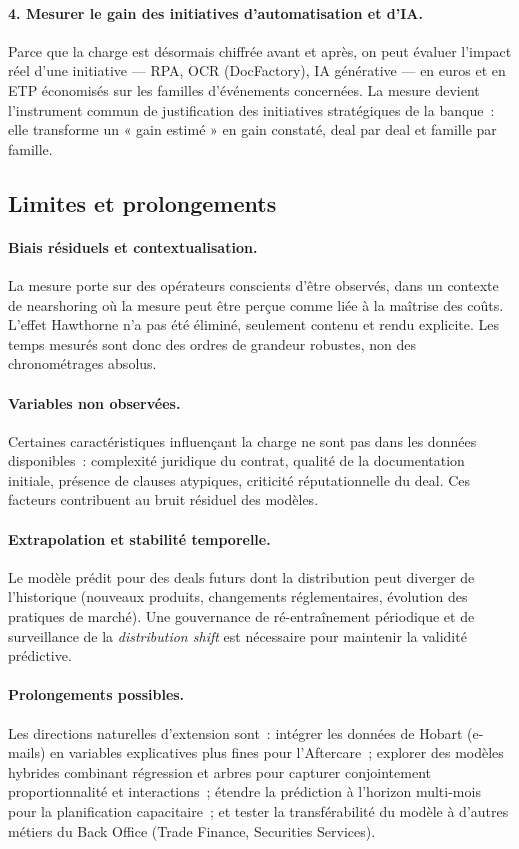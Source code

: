 \paragraph{4. Mesurer le gain des initiatives d'automatisation et d'IA.} 
Parce que la charge est désormais chiffrée avant et après, on peut évaluer l'impact réel d'une
initiative --- RPA, OCR (DocFactory), IA générative --- en euros et en ETP économisés
sur les familles d'événements concernées. La mesure devient l'instrument commun de
justification des initiatives stratégiques de la banque~: elle transforme un « gain
estimé » en gain constaté, deal par deal et famille par famille.


\subsection{Limites et prolongements}
\label{sec:limites}

\paragraph{Biais résiduels et contextualisation.}
La mesure porte sur des opérateurs conscients d'être observés, dans un contexte de nearshoring où la mesure peut être perçue comme liée à la maîtrise des coûts. L'effet Hawthorne n'a pas été éliminé, seulement contenu et rendu explicite. Les temps mesurés sont donc des ordres de grandeur robustes, non des chronométrages absolus.

\paragraph{Variables non observées.}
Certaines caractéristiques influençant la charge ne sont pas dans les données disponibles~: complexité juridique du contrat, qualité de la documentation initiale, présence de clauses atypiques, criticité réputationnelle du deal. Ces facteurs contribuent au bruit résiduel des modèles.

\paragraph{Extrapolation et stabilité temporelle.}
Le modèle prédit pour des deals futurs dont la distribution peut diverger de l'historique (nouveaux produits, changements réglementaires, évolution des pratiques de marché). Une gouvernance de ré-entraînement périodique et de surveillance de la \textit{distribution shift} est nécessaire pour maintenir la validité prédictive.

\paragraph{Prolongements possibles.}
Les directions naturelles d'extension sont~: intégrer les données de Hobart (e-mails) en variables explicatives plus fines pour l'Aftercare~; explorer des modèles hybrides combinant régression et arbres pour capturer conjointement proportionnalité et interactions~; étendre la prédiction à l'horizon multi-mois pour la planification capacitaire~; et tester la transférabilité du modèle à d'autres métiers du Back Office (Trade Finance, Securities Services).

